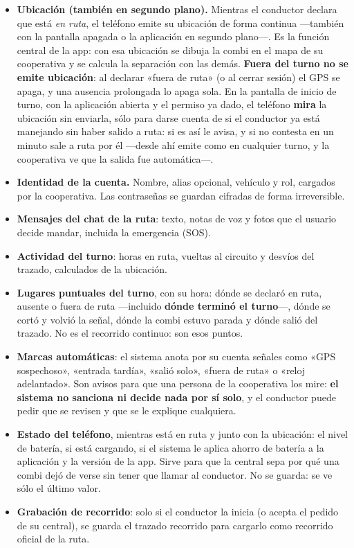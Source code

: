 \documentclass[10.5pt,a4paper]{article}
\begin{document}
\begin{itemize}[leftmargin=14pt]
\item \textbf{Ubicación (también en segundo plano).} Mientras el conductor
  declara que está \emph{en ruta}, el teléfono emite su ubicación de forma
  continua ---también con la pantalla apagada o la aplicación en segundo
  plano---. Es la función central de la app: con esa ubicación se dibuja la
  combi en el mapa de su cooperativa y se calcula la separación con las demás.
  \textbf{Fuera del turno no se emite ubicación}: al declarar «fuera de ruta»
  (o al cerrar sesión) el GPS se apaga, y una ausencia prolongada lo apaga
  sola. En la pantalla de inicio de turno, con la aplicación abierta y el
  permiso ya dado, el teléfono \textbf{mira} la ubicación sin enviarla, sólo
  para darse cuenta de si el conductor ya está manejando sin haber salido a
  ruta: si es así le avisa, y si no contesta en un minuto sale a ruta por él
  ---desde ahí emite como en cualquier turno, y la cooperativa ve que la
  salida fue automática---.
\item \textbf{Identidad de la cuenta.} Nombre, alias opcional, vehículo y rol,
  cargados por la cooperativa. Las contraseñas se guardan cifradas de forma
  irreversible.
\item \textbf{Mensajes del chat de la ruta}: texto, notas de voz y fotos que el
  usuario decide mandar, incluida la emergencia (SOS).
\item \textbf{Actividad del turno}: horas en ruta, vueltas al circuito y desvíos
  del trazado, calculados de la ubicación.
\item \textbf{Lugares puntuales del turno}, con su hora: dónde se declaró en
  ruta, ausente o fuera de ruta ---incluido \textbf{dónde terminó el
  turno}---, dónde se cortó y volvió la señal, dónde la combi estuvo parada y
  dónde salió del trazado. No es el recorrido continuo: son esos puntos.
\item \textbf{Marcas automáticas}: el sistema anota por su cuenta señales como
  «GPS sospechoso», «entrada tardía», «salió solo», «fuera de ruta» o «reloj
  adelantado». Son avisos para que una persona de la cooperativa los mire:
  \textbf{el sistema no sanciona ni decide nada por sí solo}, y el conductor
  puede pedir que se revisen y que se le explique cualquiera.
\item \textbf{Estado del teléfono}, mientras está en ruta y junto con la
  ubicación: el nivel de batería, si está cargando, si el sistema le aplica
  ahorro de batería a la aplicación y la versión de la app. Sirve para que la
  central sepa por qué una combi dejó de verse sin tener que llamar al
  conductor. No se guarda: se ve sólo el último valor.
\item \textbf{Grabación de recorrido}: solo si el conductor la inicia (o acepta
  el pedido de su central), se guarda el trazado recorrido para cargarlo como
  recorrido oficial de la ruta.
\end{itemize}
\end{document}
